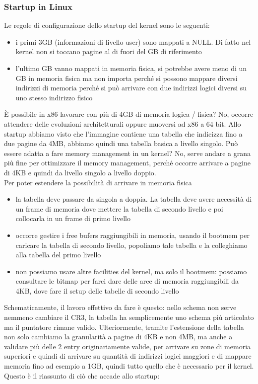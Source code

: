 \documentclass[12pt, oneside]{extbook}
\begin{document}
\subsubsection{Startup in Linux}
Le regole di configurazione dello startup del kernel sono le seguenti:
\begin{itemize}
\item i primi 3GB (informazioni di livello user) sono mappati a NULL. Di fatto nel kernel non si toccano pagine al di fuori del GB di riferimento
\item l'ultimo GB vanno mappati in memoria fisica, si potrebbe avere meno di un GB in memoria fisica ma non importa perché si possono mappare diversi indirizzi di memoria perché si può arrivare con due indirizzi logici diversi su uno stesso indirizzo fisico
\end{itemize}
È possibile in x86 lavorare con più di 4GB di memoria logica / fisica? No, occorre attendere delle evoluzioni architetturali oppure muoversi ad x86 a 64 bit. Allo startup abbiamo visto che l'immagine contiene una tabella che indicizza fino a due pagine da 4MB, abbiamo quindi una tabella basica a livello singolo. Può essere adatta a fare memory management in un kernel? No, serve andare a grana più fine per ottimizzare il memory management, perché occorre arrivare a pagine di 4KB e quindi da livello singolo a livello doppio.\\ Per poter estendere la possibilità di arrivare in memoria fisica
\begin{itemize}
\item la tabella deve passare da singola a doppia. La tabella deve avere necessità di un frame di memoria dove mettere la tabella di secondo livello e poi collocarla in un frame di primo livello
\item occorre gestire i free bufers raggiungibili in memoria, usando il bootmem per caricare la tabella di secondo livello, popoliamo tale tabella e la colleghiamo alla tabella del primo livello
\item non possiamo usare altre facilities del kernel, ma solo il bootmem: possiamo consultare le bitmap per farci dare delle aree di memoria raggiungibili da 4KB, dove fare il setup delle tabelle di secondo livello
\end{itemize}
Schematicamente, il lavoro effettivo da fare è questo: 
nello schema non serve nemmeno cambiare il CR3, la tabella ha semplicemente uno schema più articolato ma il puntatore rimane valido. Ulteriormente, tramite l'estensione della tabella non solo cambiamo la granularità a pagine di 4KB e non 4MB, ma anche a validare più delle 2 entry originariamente valide, per arrivare su zone di memoria superiori e quindi di arrivare su quantità di indirizzi logici maggiori e di mappare memoria fino ad esempio a 1GB, quindi tutto quello che è necessario per il kernel.\\ Questo è il riassunto di ciò che accade allo startup:
\end{document}
